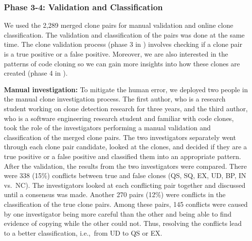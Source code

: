 \documentclass[10pt,journal,compsoc]{IEEEtran}
\begin{document}
\subsubsection{Phase 3-4: Validation and Classification}
We used the 2,289 merged clone pairs for
manual validation and online clone classification.
The validation and classification of the pairs was done at the same time. 
The clone validation process (phase 3 in ) involves checking 
if a clone pair is a true positive or a false positive. 
Moreover, we are also interested in 
the patterns of code cloning so we can gain more insights into 
how these clones are created (phase 4 in ). 

\textbf{Manual investigation:} 
To mitigate the human error, we deployed two people in the manual clone
investigation process. The first author, who is a research student working on
clone detection research for three years, and the third author, who is a
software engineering research student and familiar with code clones, took the
role of the investigators performing a manual validation and classification of
the merged clone pairs. The two investigators separately went through each clone
pair candidate, looked at the clones, and decided if they are a true positive or
a false positive and classified them into an appropriate pattern. After the
validation, the results from the two investigators were compared. 
There were 338 (15\%) conflicts between 
true and false clones (QS, SQ, EX, UD, BP, IN vs.~NC).
The investigators looked at each conflicting pair together and
discussed until a consensus was made. 
Another 270 pairs (12\%) were
conflicts in the classification of
the true clone pairs. Among these pairs, 145 conflicts were caused by
one investigator being more careful than the other and being able to find evidence of 
copying while the other could not. Thus, resolving the conflicts lead to a better classification,
 i.e.,~from UD to QS or EX.

\end{document}

